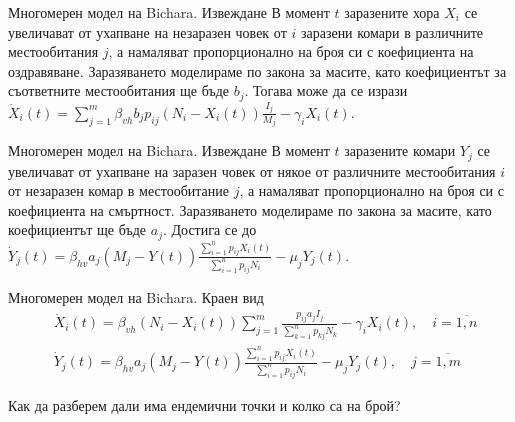 \begin{frame}[t]{Многомерен модел на Bichara. Извеждане}
  В момент $t$ заразените хора $X_i$ се увеличават от ухапване на незаразен човек от $i$ заразени комари в различните местообитания $j$, а намаляват пропорционално на броя си с коефициента на оздравяване. Заразяването моделираме по закона за масите, като коефициентът за съответните местообитания ще бъде $b_j$. Тогава може да се изрази $\dot{X}_i(t) = \sum_{j=1}^{m} \beta_{vh} b_j p_{ij} (N_i - X_i(t)) \frac{I_j}{M_j} - \gamma_i X_i(t)$.
\end{frame}

\begin{frame}[t]{Многомерен модел на Bichara. Извеждане}
  В момент $t$ заразените комари $Y_j$ се увеличават от ухапване на заразен човек от някое от различните местообитания $i$ от незаразен комар в местообитание $j$, а намаляват пропорционално на броя си с коефициента на смъртност. Заразяването моделираме по закона за масите, като коефициентът ще бъде $a_j$. Достига се до $\dot{Y}_j(t) = \beta_{hv} a_j (M_j - Y(t)) \frac{\sum_{i=1}^n p_{ij} X_i(t)}{\sum_{i=1}^n p_{ij} N_i} - \mu_j Y_j(t)$.
\end{frame}

\begin{frame}[t]{Многомерен модел на Bichara. Краен вид}
  \begin{equation}
    \label{eq:MigrationProblem}
    \begin{split}
      &\dot{X}_i(t) = \beta_{vh} (N_i - X_i(t)) \sum_{j=1}^{m} \frac{p_{ij} a_j I_j}{\sum_{k=1}^n p_{kj} N_k} - \gamma_i X_i(t), \quad i=\overline{1, n} \\
      &\dot{Y}_j(t) = \beta_{hv} a_j (M_j - Y(t)) \frac{\sum_{i=1}^n p_{ij} X_i(t)}{\sum_{i=1}^n p_{ij} N_i} - \mu_j Y_j(t), \quad j=\overline{1, m}
    \end{split}
  \end{equation}

  Как да разберем дали има ендемични точки и колко са на брой?
\end{frame}
